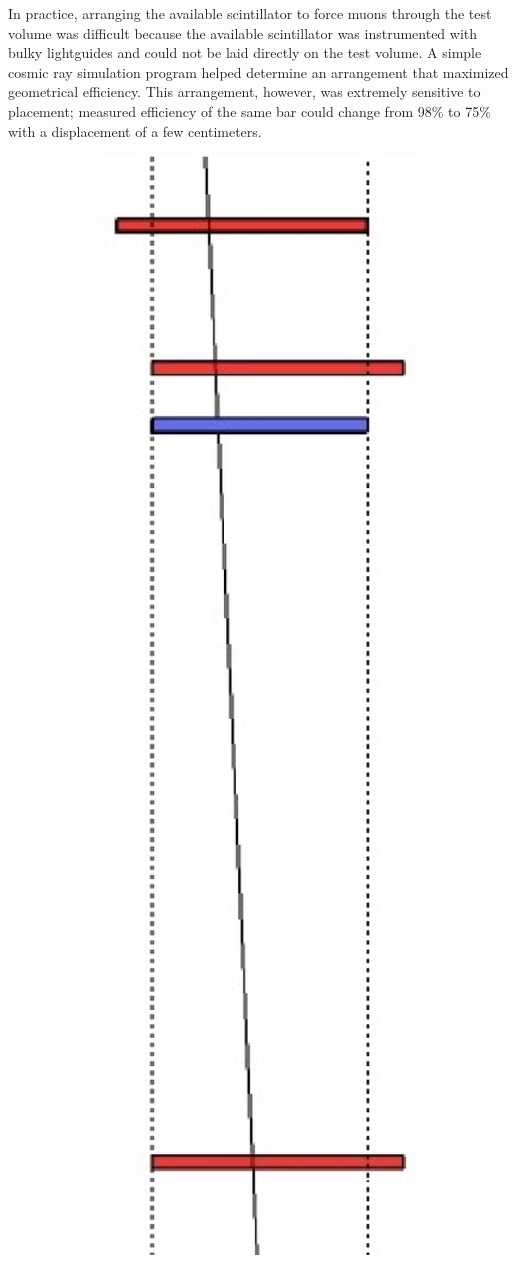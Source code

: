 In practice, arranging the available scintillator to force muons through the test volume was difficult because the available scintillator was instrumented with bulky lightguides and could not be laid directly on the test volume.  A simple cosmic ray simulation program helped determine an arrangement that maximized geometrical efficiency.  This arrangement, however, was extremely sensitive to placement; measured efficiency of the same bar could change from 98\% to 75\% with a displacement of a few centimeters.
\begin{figure}[htp]
\centering
\includegraphics[width=1.0\textwidth]{figures/veto_test_layout.eps}

\end{figure}
